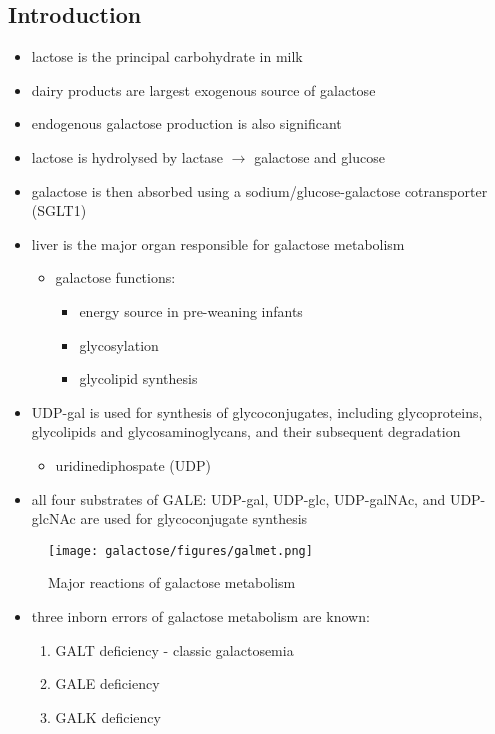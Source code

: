 \documentclass[12pt]{scrartcl}
\begin{document}
\subsection{Introduction}
\label{sec:org13777f6}
\begin{itemize}
\item lactose is the principal carbohydrate in milk
\item dairy products are largest exogenous source of galactose
\item endogenous galactose production is also significant
\item lactose is hydrolysed by lactase \(\to\) galactose and glucose
\item galactose is then absorbed using a sodium/glucose-galactose cotransporter (SGLT1)
\item liver is the major organ responsible for galactose metabolism
\begin{itemize}
\item galactose functions:
\begin{itemize}
\item energy source in pre-weaning infants
\item glycosylation
\item glycolipid synthesis
\end{itemize}
\end{itemize}

\item UDP-gal is used for synthesis of glycoconjugates, including
glycoproteins, glycolipids and glycosaminoglycans, and their
subsequent degradation
\begin{itemize}
\item uridinediphospate (UDP)
\end{itemize}
\item all four substrates of GALE: UDP-gal, UDP-glc, UDP-galNAc, and
UDP-glcNAc are used for glycoconjugate synthesis
\end{itemize}

\begin{figure}[htbp]
\centering
\texttt{[image: galactose/figures/galmet.png]}
\caption{\label{fig:org3933e8d}Major reactions of galactose metabolism}
\end{figure}

\begin{itemize}
\item three inborn errors of galactose metabolism are known:
\begin{enumerate}
\item GALT deficiency - classic galactosemia
\item GALE deficiency
\item GALK deficiency
\end{enumerate}
\end{itemize}
\end{document}
